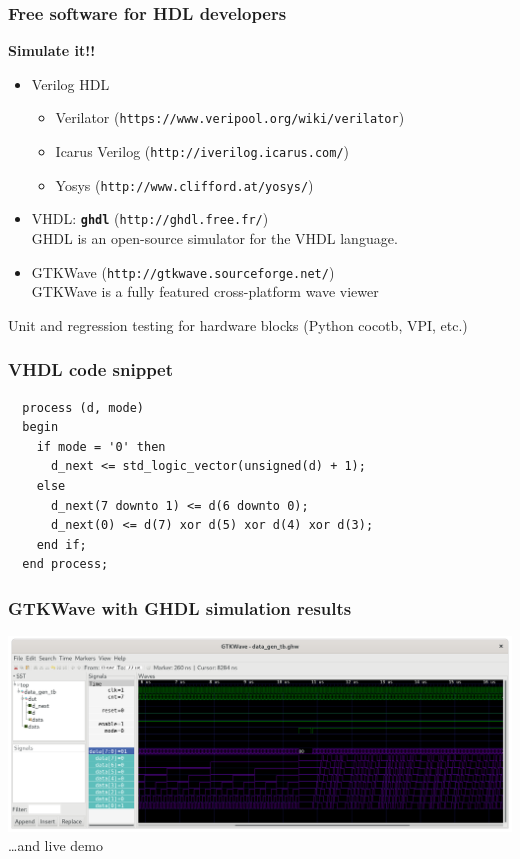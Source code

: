 \begin{frame}
\frametitle{Free software for HDL developers}
\textbf{Simulate it!!}
\begin{itemize}
  \item Verilog HDL
  \begin{itemize}
    \item Verilator (\texttt{https://www.veripool.org/wiki/verilator})
    \item Icarus Verilog (\texttt{http://iverilog.icarus.com/})
    \item Yosys (\texttt{http://www.clifford.at/yosys/})
  \end{itemize}
  \item VHDL: \textbf{\texttt{ghdl}} (\texttt{http://ghdl.free.fr/})\\
  GHDL is an open-source simulator for the VHDL language.
  \item GTKWave (\texttt{http://gtkwave.sourceforge.net/})\\
  GTKWave is a fully featured cross-platform wave viewer
\end{itemize}
Unit and regression testing for hardware blocks (Python cocotb, VPI, etc.)
\end{frame}

\begin{frame}[fragile]
\frametitle{VHDL code snippet}
\begin{verbatim}
  process (d, mode)
  begin
    if mode = '0' then
      d_next <= std_logic_vector(unsigned(d) + 1);
    else
      d_next(7 downto 1) <= d(6 downto 0);
      d_next(0) <= d(7) xor d(5) xor d(4) xor d(3);
    end if;
  end process;
\end{verbatim}
\end{frame}

\begin{frame}
  \frametitle{GTKWave with GHDL simulation results}
  \includegraphics[width=\textwidth]{sim.png}
  \dots and live demo
\end{frame}

